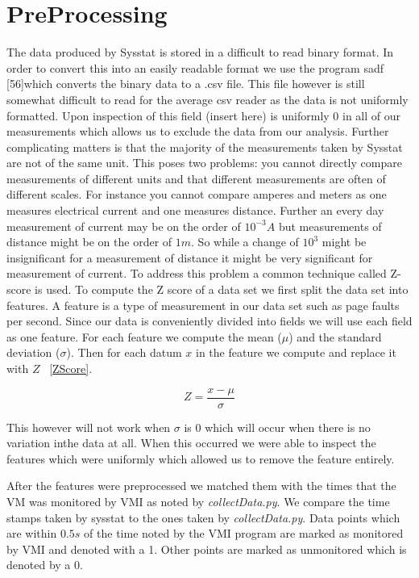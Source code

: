 \section{PreProcessing}

The data produced by Sysstat is stored in a difficult to read binary format. In order to convert this into an easily readable format we use the program sadf [56]which converts the binary data to a .csv file. This file however is still somewhat difficult to read for the average csv reader as the data is not uniformly formatted.  Upon inspection of this field (insert here) is uniformly 0 in all of our measurements which allows us to exclude the data from our analysis. Further complicating matters is that the majority of the measurements taken by Sysstat are not of the same unit. This poses two problems: you cannot directly compare measurements of different units and that different measurements are often of different scales. For instance you cannot compare amperes and meters as one measures electrical current and one measures distance. Further an every day measurement of current may be on the order of $10^{-3}A$ but measurements of distance might be on the order of $1m$. So while a change of $10^3$ might be insignificant for a measurement of distance it might be very significant for measurement of current. To address this problem a common technique called Z-score is used. To compute the Z score of a data set we first split the data set into features. A feature is a type of measurement in our data set such as page faults per second. Since our data is conveniently divided into fields we will use each field as one feature. For each feature we compute the mean ($\mu$) and the standard deviation ($\sigma$). Then for each datum $x$ in the feature we compute and replace it with $Z$ ~\ref{ZScore}.


\begin{equation}\label{ZScore}
	Z = \frac{x-\mu}{\sigma}
\end{equation}


This however will not work when $\sigma$ is 0 which will occur when there is no variation inthe data at all. When this occurred we were able to inspect the features which were uniformly which allowed us to remove the feature entirely. 

After the features were preprocessed we matched them with the times that the VM was monitored by VMI as noted by \textit{collectData.py}. We compare the time stamps taken by sysstat to the ones taken by \textit{collectData.py}. Data points which are within $0.5s$ of the time noted by the VMI program are marked as monitored by VMI and denoted with a 1. Other points are marked as unmonitored which is denoted by a 0. 


